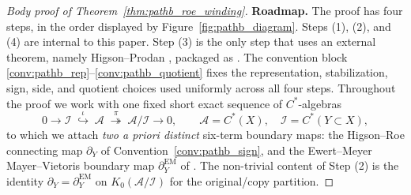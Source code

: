 \documentclass[11pt]{article}
\numberwithin{equation}{section}
\theoremstyle{definition}
\theoremstyle{remark}
\begin{document}
\begin{proof}[Body proof of Theorem~\ref{thm:pathb_roe_winding}]
\textbf{Roadmap.} The proof has four steps, in the order displayed by
Figure~\ref{fig:pathb_diagram}. Steps (1), (2), and (4) are internal to this paper. Step (3) is
the only step that uses an external theorem, namely Higson--Prodan
\cite{HigsonProdanUniversalPRL,HigsonProdanUniversalArxiv}, packaged as .
The convention block \ref{conv:pathb_rep}--\ref{conv:pathb_quotient} fixes the representation,
stabilization, sign, side, and quotient choices used uniformly across all four steps. Throughout
the proof we work with one fixed short exact sequence of \(C^*\)-algebras
\begin{equation}\label{eq:body_short_exact}
0\longrightarrow \mathcal I\;\overset{\iota}{\hookrightarrow}\;\mathcal A
\;\overset{\pi}{\twoheadrightarrow}\;\mathcal A/\mathcal I\longrightarrow 0,
\qquad
\mathcal A=C^*(X),\quad \mathcal I=C^*(Y\subset X),
\end{equation}
to which we attach \emph{two a priori distinct} six-term boundary maps: the Higson--Roe
connecting map \(\partial_Y\) of Convention~\ref{conv:pathb_sign}, and the Ewert--Meyer
Mayer--Vietoris boundary map \(\partial^{\mathrm{EM}}_Y\) of \cite{EwertMeyer2019}. The
non-trivial content of Step (2) is the identity
\(\partial_Y=\partial^{\mathrm{EM}}_Y\) on \(K_0(\mathcal A/\mathcal I)\) for the original/copy
partition.


\end{proof}
\end{document}
